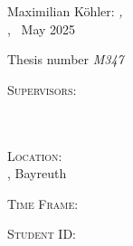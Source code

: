 
\begingroup
\thispagestyle{empty}

\hfill

\vfill

Maximilian Köhler: \textit{\titel,} \\
\arbeit, \textcopyright~May 2025
\medskip

Thesis number {\itshape M347}
\bigskip

\textsc{Supervisors}: \\
\betreuer \\
\betreuerzwei \\ 
\gutachter
\medskip

\textsc{Location}: \\
\abgabeort, Bayreuth
\medskip

\textsc{Time Frame}: \\
\zeitraum
\medskip

\textsc{Student ID}: \\
\matrikelnr

\endgroup


